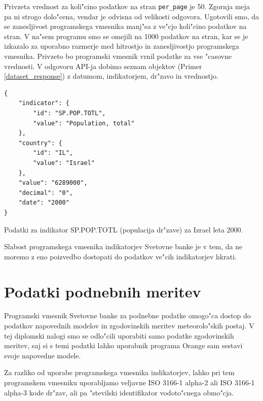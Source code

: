 
Privzeta vrednost za koli"cino podatkov na stran \verb|per_page| je 50. 
Zgornja meja pa ni strogo dolo"cena, vendar je odvisna od velikosti odgovora. 
Ugotovili smo, da se zanesljivost programskega vmesnika manj"sa z ve"cjo 
koli"cino podatkov na stran. V na"sem programu smo se omejili na 1000 podatkov
na stran, kar se je izkazalo za uporabno razmerje med hitrostjo in 
zanesljivostjo programskega vmesnika. Privzeto bo programski vmesnik vrnil 
podatke za vse "casovne vrednosti. V odgovoru API-ja dobimo seznam objektov 
(Primer \ref{dataset_response}) z datumom, indikatorjem, dr"zavo in vrednostjo.

\begin{snippet}
\begin{center}
\begin{lstlisting}
{
    "indicator": {
        "id": "SP.POP.TOTL",
        "value": "Population, total"
    },
    "country": {
        "id": "IL",
        "value": "Israel"
    },
    "value": "6289000",
    "decimal": "0",
    "date": "2000"
}
\end{lstlisting}
\end{center}
\caption{Podatki za indikator SP.POP.TOTL (populacija dr"zave) za Izrael leta
2000.}
\label{dataset_response}
\end{snippet} 

Slabost programskega vmesnika indikatorjev Svetovne banke je v tem, da ne
moremo z eno poizvedbo dostopati do podatkov ve"cih indikatorjev hkrati.

\section{Podatki podnebnih meritev}

Programski vmesnik Svetovne banke za podnebne podatke omogo"ca dostop do 
podatkov napovednih modelov in zgodovinskih meritev meteorolo"skih postaj. V tej 
diplomski nalogi smo se odlo"cili uporabiti samo podatke zgodovinskih meritev, 
saj si s temi podatki lahko uporabnik programa Orange sam sestavi svoje 
napovedne modele.

Za razliko od uporabe programskega vmesnika indikatorjev, lahko pri tem
programskem vmesniku uporabljamo veljavne ISO 3166-1 alpha-2 ali ISO 3166-1 
alpha-3 kode dr"zav, ali pa "stevilski identifikator vodoto"cnega 
obmo"cja.

